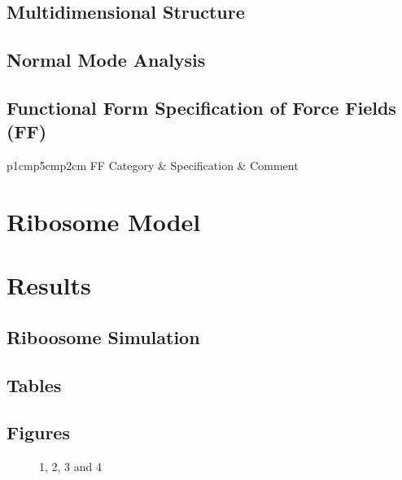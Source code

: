 \subsection{Multidimensional Structure}

\subsection{Normal Mode Analysis}

\subsection{Functional Form Specification of Force Fields (FF)}

\begin{table}[H]
\caption{Table 1}
\tiny
\begin{tabular}{p{1cm}p{5cm}p{2cm}}
\hline
FF Category  & Specification & Comment  \\
\hline
\hline
\end{tabular}
\end{table}

\section{Ribosome Model}


\section{Results}

\subsection{Riboosome Simulation}


\subsection{Tables}

\subsection{Figures}

\begin{figure}[H]
	\centering
	\begin{minipage}[b]{0.5\linewidth}
	\end{minipage}\hfill
	\begin{minipage}[b]{0.5\linewidth}
	\end{minipage}\hfill	
	\begin{minipage}[b]{0.5\linewidth}
	\end{minipage}\hfill
	\begin{minipage}[b]{0.5\linewidth}
	\end{minipage}\hfill
	\caption{1, 2, 3 and 4}
	\label{fig:Figure1}
\end{figure} 



